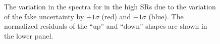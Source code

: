 \begin{figure}[h]
  \centering
  \caption{The variation in the \ptmiss spectra for \ttll in the high \mttll SRs due to the variation of the fake \ptmiss uncertainty by $+1\sigma$ (red) and $-1\sigma$ (blue). The normalized residuals of the ``up'' and ``down'' shapes are shown in the lower panel.}
  \label{fig:fakeMETshape}
\end{figure}

